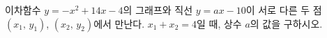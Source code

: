 이차함수 $y=-x^2+14x-4$의 그래프와 직선 $y=ax-10$이 서로 다른 두 점 $(x_1,\,y_1)$, $(x_2,\,y_2)$에서 만난다. $x_1+x_2=4$일 때, 상수 $a$의 값을 구하시오.
